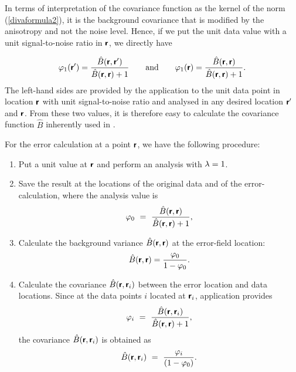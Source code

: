 In terms of interpretation of the covariance function as the kernel of the norm (\eqref{divaformula2}), it is the background covariance that is modified by the anisotropy and not the noise level. Hence, if we put the unit data value with a unit signal-to-noise ratio in $\mbox{\boldmath $ \protect\mathsf{r} $}$, we directly have

\begin{equation}
\varphi_1(\mbox{\boldmath $ \protect\mathsf{r} $}^\prime) = { \hat{B} (\mbox{\boldmath $ \protect\mathsf{r} $},\mbox{\boldmath $ \protect\mathsf{r} $}^\prime)\over   \hat{B}(\mbox{\boldmath $ \protect\mathsf{r} $},\mbox{\boldmath $ \protect\mathsf{r} $}) + 1 } \qquad \textrm{and} \qquad 
\varphi_1(\mbox{\boldmath $ \protect\mathsf{r} $}) = { \hat{B} (\mbox{\boldmath $ \protect\mathsf{r} $},\mbox{\boldmath $ \protect\mathsf{r} $}) \over  \hat{B}(\mbox{\boldmath $ \protect\mathsf{r} $},\mbox{\boldmath $ \protect\mathsf{r} $}) + 1 }.
\end{equation}
The left-hand sides are provided by the \diva application to the unit data point in location $\mbox{\boldmath $ \protect\mathsf{r} $}$ with unit signal-to-noise ratio and analysed in any desired location $\mbox{\boldmath $ \protect\mathsf{r} $}^\prime$ and $\mbox{\boldmath $ \protect\mathsf{r} $}$. From these two values, it is therefore easy to calculate the covariance function $\hat{B}$ inherently used in \diva.

For the error calculation at a point $\mbox{\boldmath $ \protect\mathsf{r} $}$, we have the following procedure: 

\begin{enumerate}

\item Put a unit value at $\mbox{\boldmath $ \protect\mathsf{r} $}$ and perform an analysis with $\lambda=1$.

\item Save the result at the locations of the original data and of the error-calculation, where the analysis value is
\begin{equation}
\varphi_0 ~=~{ \hat{B} (\mbox{\boldmath $ \protect\mathsf{r} $},\mbox{\boldmath $ \protect\mathsf{r} $}) \over \hat{B}(\mbox{\boldmath $ \protect\mathsf{r} $},\mbox{\boldmath $ \protect\mathsf{r} $}) + 1 },
\end{equation}

\item Calculate the background variance $\hat{B}(\mbox{\boldmath $ \protect\mathsf{r} $},\mbox{\boldmath $ \protect\mathsf{r} $})$ at the error-field location:
\begin{equation}
\hat{B} (\vect{r},\vect{r}) = { \varphi_0 \over 1 - \varphi_0}.
\label{eq:brr}
\end{equation}

\item Calculate the covariance $\hat{B} (\mbox{\boldmath $ \protect\mathsf{r} $},\mbox{\boldmath $ \protect\mathsf{r} $}_i)$ between the error location and data locations. Since at the data points $i$ located at $\mbox{\boldmath $ \protect\mathsf{r} $}_i$, \diva application provides
\begin{equation}
\varphi_i ~=~ { \hat{B} (\mbox{\boldmath $ \protect\mathsf{r} $},\mbox{\boldmath $ \protect\mathsf{r} $}_i) \over \hat{B}(\mbox{\boldmath $ \protect\mathsf{r} $},\mbox{\boldmath $ \protect\mathsf{r} $}) + 1 },
\end{equation}
the covariance $\hat{B} (\mbox{\boldmath $ \protect\mathsf{r} $},\mbox{\boldmath $ \protect\mathsf{r} $}_i)$ is obtained as
\begin{equation}
\hat{B} (\vect{r},\vect{r}_i)~=~{\varphi_i \over ( 1-\varphi_0 )}.
\label{eq:btildco}
\end{equation}

\end{enumerate}

